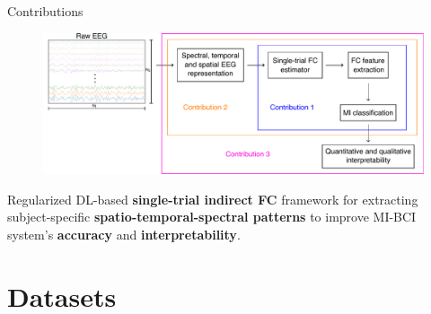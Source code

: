 \documentclass[aspectratio=169]{beamer}
\begin{document}
\begin{frame}{Contributions}
    \begin{figure}[h!]
        \centering
        \includegraphics[scale=0.6]{../Tesis_document/Figures/outline_and_contributions/general_contributions.pdf}
    \end{figure}
    \centering
    Regularized DL-based \textbf{single-trial indirect FC} framework for extracting subject-specific \textbf{spatio-temporal-spectral patterns} to improve MI-BCI system's \textbf{accuracy} and \textbf{interpretability}.
\end{frame}

\section{Datasets}
\end{document}
